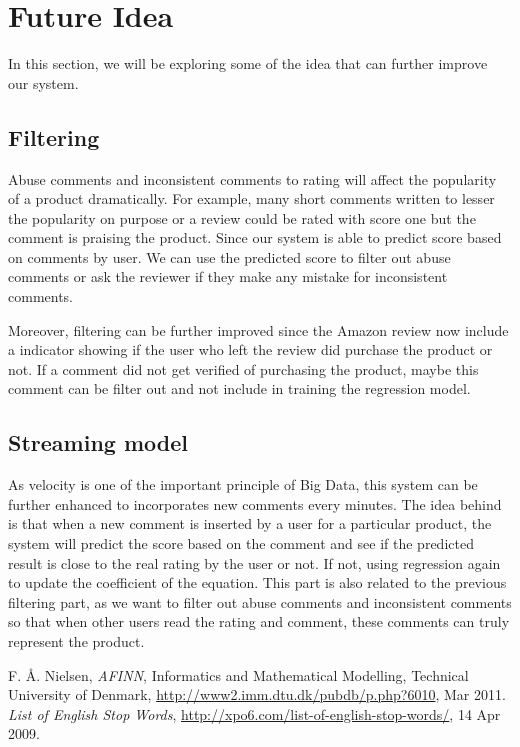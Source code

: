 \section{Future Idea}
In this section, we will be exploring some of the idea that can further improve our system.
\subsection{Filtering}
Abuse comments and inconsistent comments to rating will affect the popularity of a product dramatically. For example, many short comments written to lesser the popularity on purpose or a review could be rated with score one but the comment is praising the product. Since our system is able to predict score based on comments by user. We can use the predicted score to filter out abuse comments or ask the reviewer if they make any mistake for inconsistent comments. 

Moreover, filtering can be further improved since the Amazon review now include a indicator showing if the user who left the review did purchase the product or not. If a comment did not get verified of purchasing the product, maybe this comment can be filter out and not include in training the regression model.

\subsection{Streaming model}
As velocity is one of the important principle of Big Data, this system can be further enhanced to incorporates new comments every minutes. The idea behind is that when a new comment is inserted by a user for a particular product, the system will predict the score based on the comment and see if the predicted result is close to the real rating by the user or not. If not, using regression again to update the coefficient of the equation. This part is also related to the previous filtering part, as we want to filter out abuse comments and inconsistent comments so that when other users read the rating and comment, these comments can truly represent the product.

\begin{thebibliography}{1}
	F. {\AA}. Nielsen, 
	{\em AFINN},
	Informatics and Mathematical Modelling, Technical University of Denmark,
	\url{http://www2.imm.dtu.dk/pubdb/p.php?6010},
	Mar 2011.
	{\em List of English Stop Words},
	\url{http://xpo6.com/list-of-english-stop-words/},
	14 Apr 2009.
\end{thebibliography}
